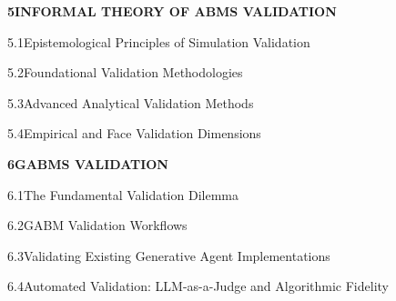 \documentclass[12pt,a4paper]{report}
\begin{document}
\noindent\textbf{5\quad INFORMAL THEORY OF ABMS VALIDATION}\dotfill\textbf{\pageref{chap:abm_validation}}\par
\vspace{3pt}
\noindent\hspace{0.3in}5.1\quad Epistemological Principles of Simulation Validation\dotfill\pageref{sec:validation_principles}\par
\vspace{2pt}
\noindent\hspace{0.3in}5.2\quad Foundational Validation Methodologies\dotfill\pageref{sec:foundational_val}\par
\vspace{2pt}
\noindent\hspace{0.3in}5.3\quad Advanced Analytical Validation Methods\dotfill\pageref{sec:advanced_val}\par
\vspace{2pt}
\noindent\hspace{0.3in}5.4\quad Empirical and Face Validation Dimensions\dotfill\pageref{sec:empirical_face}\par
\vspace{6pt}

\noindent\textbf{6\quad GABMS VALIDATION}\dotfill\textbf{\pageref{chap:gabms_validation}}\par
\vspace{3pt}
\noindent\hspace{0.3in}6.1\quad The Fundamental Validation Dilemma\dotfill\pageref{sec:black_box_dilemma}\par
\vspace{2pt}
\noindent\hspace{0.3in}6.2\quad GABM Validation Workflows\dotfill\pageref{sec:validation_workflows}\par
\vspace{2pt}
\noindent\hspace{0.3in}6.3\quad Validating Existing Generative Agent Implementations\dotfill\pageref{sec:human_eval_studies}\par
\vspace{2pt}
\noindent\hspace{0.3in}6.4\quad Automated Validation: LLM-as-a-Judge and Algorithmic Fidelity\dotfill\pageref{sec:llm_as_judge}\par
\vspace{6pt}
\end{document}
